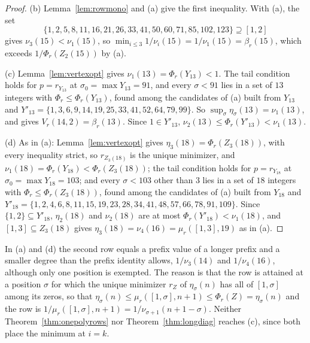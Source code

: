 \documentclass[11pt]{article}
\begin{document}
\begin{proof}
(b) Lemma~\ref{lem:rowmono} and (a) give the first inequality.  With (a), the set
\[
  \{1,2,5,8,11,16,21,26,33,41,50,60,71,85,102,123\}\supseteq[1,2]
\]
gives $\nu_3(15)<\nu_1(15)$, so
$\min_{i\le3}1/\nu_i(15)=1/\nu_1(15)=\beta_r(15)$, which exceeds
$1/\Phi_r(Z_2(15))$ by (a).

(c) Lemma~\ref{lem:vertexopt} gives $\nu_1(13)=\Phi_r(Y_{13})<1$.  The
tail condition holds for $p=r_{Y_{13}}$ at $\sigma_0=\max Y_{13}=91$, and every
$\sigma<91$ lies in a set of $13$ integers with
$\Phi_r\le\Phi_r(Y_{13})$, found among the candidates of (a) built from
$Y_{13}$ and
$Y'_{13}=\{1,3,6,9,14,19,25,33,41,52,64,79,99\}$.  So
$\sup_\sigma\eta_\sigma(13)=\nu_1(13)$, and
\cite[Proposition~2.1(b)]{coefficient-mass-rows} gives $V_r(14,2)=\beta_r(13)$.  Since
$1\in Y'_{13}$, $\nu_2(13)\le\Phi_r(Y'_{13})<\nu_1(13)$.

(d) As in (a): Lemma~\ref{lem:vertexopt} gives $\eta_3(18)=\Phi_r(Z_3(18))$,
with every inequality strict, so $r_{Z_3(18)}$ is the unique minimizer,
and $\nu_1(18)=\Phi_r(Y_{18})<\Phi_r(Z_3(18))$; the tail condition holds for
$p=r_{Y_{18}}$ at $\sigma_0=\max Y_{18}=103$; and every $\sigma<103$ other than $3$
lies in a set of $18$ integers with $\Phi_r\le\Phi_r(Z_3(18))$, found among
the candidates of (a) built from $Y_{18}$ and
$Y'_{18}=\{1,2,4,6,8,11,15,19,23,28,34,41,48,57,66,78,91,109\}$.  Since
$\{1,2\}\subseteq Y'_{18}$, $\eta_2(18)$ and $\nu_2(18)$ are at most
$\Phi_r(Y'_{18})<\nu_1(18)$, and $[1,3]\subseteq Z_3(18)$ gives
$\eta_3(18)=\nu_4(16)=\mu_r([1,3],19)$ as in (a).
\end{proof}

In (a) and (d) the second row equals a prefix value of a longer prefix and
a smaller degree than the prefix identity allows, $1/\nu_3(14)$ and
$1/\nu_4(16)$, although only one position is exempted.  The reason is that
the row is attained at a position $\sigma$ for which the unique minimizer
$r_Z$ of $\eta_\sigma(n)$ has all of $[1,\sigma]$ among its zeros, so that
$\eta_\sigma(n)\le\mu_r([1,\sigma],n+1)\le\Phi_r(Z)=\eta_\sigma(n)$ and the
row is $1/\mu_r([1,\sigma],n+1)=1/\nu_{\sigma+1}(n+1-\sigma)$.  Neither
Theorem~\ref{thm:onepolyrows} nor Theorem~\ref{thm:longdiag} reaches (c),
since both place the minimum at $i=k$.
\end{document}
